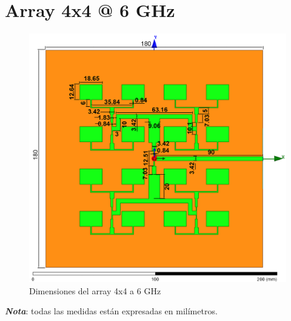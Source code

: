 \section{Array 4x4 @ 6 GHz}
\vfill
\begin{figure}[H]
   	 \centering
        \includegraphics[width=\textwidth ,height=\textheight, keepaspectratio=true]{archivos/desarrollo/autocad/11}
        \caption{Dimensiones del array 4x4 a 6 GHz}
        \label{fig:4x42}
\end{figure}
\vfill
\textit{\textbf{Nota}}: todas las medidas están expresadas en milímetros.
\newpage

